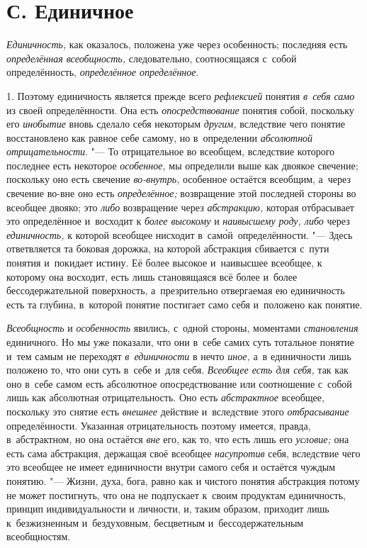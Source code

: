 \section[С. Единичное]{С. Единичное}

{\em Единичность,} как оказалось, положена уже через особенность; последняя
есть {\em определённая всеобщность,} следовательно, соотносящаяся с~собой
определённость, {\em определённое определённое}.

1. Поэтому единичность является прежде всего {\em рефлексией} понятия
{\em в~себя само} из своей определённости. Она есть {\em опосредствование}
понятия собой, поскольку его {\em инобытие} вновь сделало себя некоторым
{\em другим,} вследствие чего понятие восстановлено как равное себе самому,
но в~определении {\em абсолютной отрицательности}. "--- То отрицательное во
всеобщем, вследствие которого последнее есть некоторое {\em особенное,} мы
определили выше
как двоякое свечение; поскольку оно есть свечение {\em во-внутрь,}
особенное остаётся всеобщим, а~через свечение во-вне оно есть
{\em определённое;} возвращение этой последней стороны во всеобщее двояко; это
{\em либо} возвращение через {\em абстракцию,}
которая отбрасывает это определённое и~восходит к {\em более высокому} и
{\em наивысшему роду, либо} через {\em единичность,} к
которой всеобщее нисходит в~сам\'{о}й~определённости. "--- Здесь
ответвляется та боковая дорожка, на которой абстракция сбивается с~пути
понятия и~покидает истину. Её более высокое и~наивысшее всеобщее, к
которому она восходит, есть лишь становящаяся всё более и~более
бессодержательной поверхность, а~презрительно отвергаемая ею единичность
есть та глубина, в~которой понятие постигает само себя и~положено как понятие.

{\em Всеобщность} и {\em особенность} явились, с~одной стороны, моментами
{\em становления} единичного. Но мы уже показали, что они в~себе самих суть
тотальное понятие и~тем самым не переходят {\em в~единичности} в
нечто {\em иное,} а~в единичности лишь положено то, что они суть
в~себе и~для себя. {\em Всеобщее есть для себя,}
так как оно в~себе самом есть абсолютное опосредствование или
соотношение с~собой лишь как абсолютная отрицательность. Оно есть
{\em абстрактное} всеобщее, поскольку это снятие есть {\em внешнее} действие
и~вследствие этого {\em отбрасывание}
определённости. Указанная отрицательность поэтому имеется,
правда, в~абстрактном, но она остаётся {\em вне} его, как то,
что есть лишь его {\em условие;}
она есть сама абстракция, держащая своё всеобщее {\em насупротив} себя,
вследствие чего это всеобщее не имеет единичности внутри самого себя и
остаётся чуждым понятию. "--- Жизни, духа, бога, равно как и
чистого понятия абстракция потому не может постигнуть, что она не
подпускает к~своим продуктам единичность, принцип индивидуальности и
личности, и, таким образом, приходит лишь к~безжизненным и~бездуховным,
бесцветным и~бессодержательным всеобщностям.

